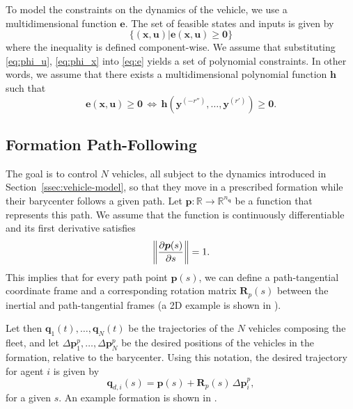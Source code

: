 To model the constraints on the dynamics of the vehicle, we use a multidimensional function $\bm{e}$.
The set of feasible states and inputs is given by
\begin{equation}
    \big\{\left(\bm{x}, \bm{u}\right) \big| \bm{e} (\bm{x}, \bm{u}) \geq \bm{0}\big\}
    \label{eq:e}
\end{equation}
where the inequality is defined component-wise.
We assume that substituting \eqref{eq:phi_u}, \eqref{eq:phi_x} into \eqref{eq:e} yields a set of polynomial constraints.
In other words, we assume that there exists a multidimensional polynomial function $\bm{h}$ such that
\begin{equation}
    \bm{e} (\bm{x}, \bm{u})
    \geq
    \bm{0}
    \, \iff \,
    \bm{h} \left( \bm{y}^{(-r'')}, \ldots, \bm{y}^{(r')} \right)
    \geq
    \bm{0}.
\label{equ:constraint-h-geq-0}
\end{equation}



\subsection{Formation Path-Following}
\label{ssec:formation-path-following}



The goal is to control $N$ vehicles, all subject to the dynamics introduced in Section~\ref{ssec:vehicle-model}, so that they move in a prescribed formation while their barycenter follows a given path.
Let $\bm{p} : \mathbb{R} \rightarrow \mathbb{R}^{n_{\bm{q}}}$ be a function that represents this path. We assume that the function is continuously differentiable and its first derivative satisfies
\begin{equation}
    \left\|\frac{\partial \bm{p}(s)}{\partial s}\right\| = 1.
    \label{eq:path_assumption}
\end{equation}
This implies that for every path point $\bm{p}(s)$, we can define a path-tangential coordinate frame and a corresponding rotation matrix $\bm{R}_p(s)$ between the inertial and path-tangential frames (a 2D example is shown in ).

Let then $\bm{q}_1(t), \ldots, \bm{q}_N(t)$ be the trajectories of the $N$ vehicles composing the fleet, and let $\Delta \bm{p}_1^p, \ldots, \Delta \bm{p}_N^p$ be the desired  positions of the vehicles in the formation, relative to the barycenter. Using this notation, the desired trajectory for agent $i$ is given by
\begin{equation}
    \bm{q}_{d,i}(s) = \bm{p}(s) + \bm{R}_p(s)\, \Delta \bm{p}_i^p,
\end{equation} 
for a given $s$.
An example formation is shown in .

